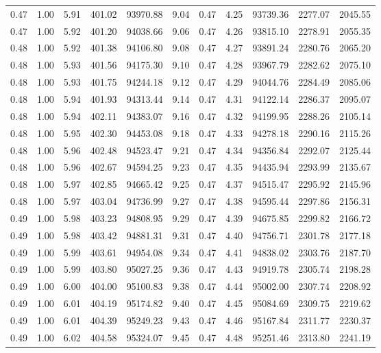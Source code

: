 \begin{table}[!ht]
\begin{tabular}{rrrrrrrrrrr}
0.47 & 1.00 & 5.91 & 401.02 & 93970.88 & 9.04 & 0.47 & 4.25 & 93739.36 & 2277.07 & 2045.55 \\
0.47 & 1.00 & 5.92 & 401.20 & 94038.66 & 9.06 & 0.47 & 4.26 & 93815.10 & 2278.91 & 2055.35 \\
0.48 & 1.00 & 5.92 & 401.38 & 94106.80 & 9.08 & 0.47 & 4.27 & 93891.24 & 2280.76 & 2065.20 \\
0.48 & 1.00 & 5.93 & 401.56 & 94175.30 & 9.10 & 0.47 & 4.28 & 93967.79 & 2282.62 & 2075.10 \\
0.48 & 1.00 & 5.93 & 401.75 & 94244.18 & 9.12 & 0.47 & 4.29 & 94044.76 & 2284.49 & 2085.06 \\
0.48 & 1.00 & 5.94 & 401.93 & 94313.44 & 9.14 & 0.47 & 4.31 & 94122.14 & 2286.37 & 2095.07 \\
0.48 & 1.00 & 5.94 & 402.11 & 94383.07 & 9.16 & 0.47 & 4.32 & 94199.95 & 2288.26 & 2105.14 \\
0.48 & 1.00 & 5.95 & 402.30 & 94453.08 & 9.18 & 0.47 & 4.33 & 94278.18 & 2290.16 & 2115.26 \\
0.48 & 1.00 & 5.96 & 402.48 & 94523.47 & 9.21 & 0.47 & 4.34 & 94356.84 & 2292.07 & 2125.44 \\
0.48 & 1.00 & 5.96 & 402.67 & 94594.25 & 9.23 & 0.47 & 4.35 & 94435.94 & 2293.99 & 2135.67 \\
0.48 & 1.00 & 5.97 & 402.85 & 94665.42 & 9.25 & 0.47 & 4.37 & 94515.47 & 2295.92 & 2145.96 \\
0.48 & 1.00 & 5.97 & 403.04 & 94736.99 & 9.27 & 0.47 & 4.38 & 94595.44 & 2297.86 & 2156.31 \\
0.49 & 1.00 & 5.98 & 403.23 & 94808.95 & 9.29 & 0.47 & 4.39 & 94675.85 & 2299.82 & 2166.72 \\
0.49 & 1.00 & 5.98 & 403.42 & 94881.31 & 9.31 & 0.47 & 4.40 & 94756.71 & 2301.78 & 2177.18 \\
0.49 & 1.00 & 5.99 & 403.61 & 94954.08 & 9.34 & 0.47 & 4.41 & 94838.02 & 2303.76 & 2187.70 \\
0.49 & 1.00 & 5.99 & 403.80 & 95027.25 & 9.36 & 0.47 & 4.43 & 94919.78 & 2305.74 & 2198.28 \\
0.49 & 1.00 & 6.00 & 404.00 & 95100.83 & 9.38 & 0.47 & 4.44 & 95002.00 & 2307.74 & 2208.92 \\
0.49 & 1.00 & 6.01 & 404.19 & 95174.82 & 9.40 & 0.47 & 4.45 & 95084.69 & 2309.75 & 2219.62 \\
0.49 & 1.00 & 6.01 & 404.39 & 95249.23 & 9.43 & 0.47 & 4.46 & 95167.84 & 2311.77 & 2230.37 \\
0.49 & 1.00 & 6.02 & 404.58 & 95324.07 & 9.45 & 0.47 & 4.48 & 95251.46 & 2313.80 & 2241.19 \\

\end{tabular}
\end{table}
